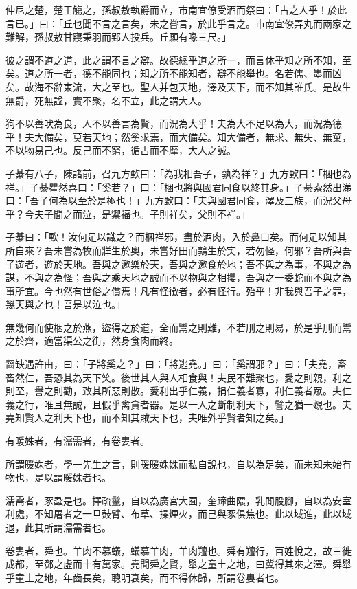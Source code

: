 \begin{pinyinscope}
仲尼之楚，楚王觴之，孫叔敖執爵而立，市南宜僚受酒而祭曰：「古之人乎！於此言已。」曰：「丘也聞不言之言矣，未之嘗言，於此乎言之。市南宜僚弄丸而兩家之難解，孫叔敖甘寢秉羽而郢人投兵。丘願有喙三尺。」

彼之謂不道之道，此之謂不言之辯。故德總乎道之所一，而言休乎知之所不知，至矣。道之所一者，德不能同也；知之所不能知者，辯不能舉也。名若儒、墨而凶矣。故海不辭東流，大之至也。聖人并包天地，澤及天下，而不知其誰氏。是故生無爵，死無諡，實不聚，名不立，此之謂大人。

狗不以善吠為良，人不以善言為賢，而況為大乎！夫為大不足以為大，而況為德乎！夫大備矣，莫若天地；然奚求焉，而大備矣。知大備者，無求、無失、無棄，不以物易己也。反己而不窮，循古而不摩，大人之誠。

子綦有八子，陳諸前，召九方歅曰：「為我相吾子，孰為祥？」九方歅曰：「梱也為祥。」子綦瞿然喜曰：「奚若？」曰：「梱也將與國君同食以終其身。」子綦索然出涕曰：「吾子何為以至於是極也！」九方歅曰：「夫與國君同食，澤及三族，而況父母乎？今夫子聞之而泣，是禦福也。子則祥矣，父則不祥。」

子綦曰：「歅！汝何足以識之？而梱祥邪，盡於酒肉，入於鼻口矣。而何足以知其所自來？吾未嘗為牧而牂生於奧，未嘗好田而鶉生於宎，若勿怪，何邪？吾所與吾子遊者，遊於天地。吾與之邀樂於天，吾與之邀食於地；吾不與之為事，不與之為謀，不與之為怪；吾與之乘天地之誠而不以物與之相攖，吾與之一委蛇而不與之為事所宜。今也然有世俗之償焉！凡有怪徵者，必有怪行。殆乎！非我與吾子之罪，幾天與之也！吾是以泣也。」

無幾何而使梱之於燕，盜得之於道，全而鬻之則難，不若刖之則易，於是乎刖而鬻之於齊，適當渠公之街，然身食肉而終。

齧缺遇許由，曰：「子將奚之？」曰：「將逃堯。」曰：「奚謂邪？」曰：「夫堯，畜畜然仁，吾恐其為天下笑。後世其人與人相食與！夫民不難聚也，愛之則親，利之則至，譽之則勸，致其所惡則散。愛利出乎仁義，捐仁義者寡，利仁義者眾。夫仁義之行，唯且無誠，且假乎禽貪者器。是以一人之斷制利天下，譬之猶一覕也。夫堯知賢人之利天下也，而不知其賊天下也，夫唯外乎賢者知之矣。」

有暖姝者，有濡需者，有卷婁者。

所謂暖姝者，學一先生之言，則暖暖姝姝而私自說也，自以為足矣，而未知未始有物也，是以謂暖姝者也。

濡需者，豕蝨是也。擇疏鬣，自以為廣宮大囿，奎蹄曲隈，乳閒股腳，自以為安室利處，不知屠者之一旦鼓臂、布草、操煙火，而己與豕俱焦也。此以域進，此以域退，此其所謂濡需者也。

卷婁者，舜也。羊肉不慕蟻，蟻慕羊肉，羊肉羶也。舜有羶行，百姓悅之，故三徙成都，至鄧之虛而十有萬家。堯聞舜之賢，舉之童土之地，曰冀得其來之澤。舜舉乎童土之地，年齒長矣，聰明衰矣，而不得休歸，所謂卷婁者也。


\end{pinyinscope}
